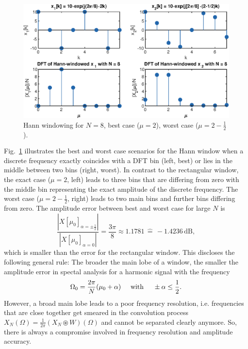 \documentclass[11pt,a4paper,DIV=12]{scrartcl}
\begin{document}
\begin{figure}
		\centering
		\includegraphics[]{graphics/DFTbestworstcase_HannWin}
		\caption{Hann windowing for $N=8$, best case ($\mu=2$), worst case ($\mu=2-\frac{1}{2}$).}
		\label{DFTbestworstcase_HannWin}
\end{figure}

Fig.~\ref{DFTbestworstcase_HannWin} illustrates the best and worst case
scenarios for the Hann window when a discrete frequency exactly coincides
with a DFT bin (left, best) or lies in the middle between two bins (right, worst).
%
In contrast to the rectangular window, the exact case ($\mu=2$, left) leads to
three bins that are differing from zero with the middle bin representing the
exact amplitude of the discrete frequency.
%
The worst case ($\mu=2-\frac{1}{2}$, right) leads to two main bins and further
bins differing from zero.
%
The amplitude error between best and worst case for large $N$ is
%
\begin{equation}
\frac{\left|X[\mu_0]_{\alpha=\pm\frac{1}{2}}\right|}{\left|X[\mu_0]_{\alpha=0}\right|}=\frac{3\pi}{8}\approx1.1781\,\hat{=}\,-1.4236\,\text{dB},
\end{equation}
%
which is smaller than the error for the rectangular window.
%
This discloses the following general rule: The broader the main lobe of a window,
the smaller the amplitude error in spectal analysis for a harmonic signal with
the frequency
%
\begin{equation}
\Omega_0=\frac{2\pi}{N}(\mu_0+\alpha) \hspace{5mm} \text{with} \hspace{5mm} \pm\alpha\leq\frac{1}{2}.
\end{equation}
%
However, a broad main lobe leads to a poor frequency resolution, i.e.
frequencies that are close together get smeared in the convolution process
$X_N(\Omega)=\frac{1}{2\pi}(X_N\circledast W)(\Omega)$ and cannot be separated
clearly anymore. So, there is always a compromise involved in frequency
resolution and amplitude accuracy.
\end{document}
